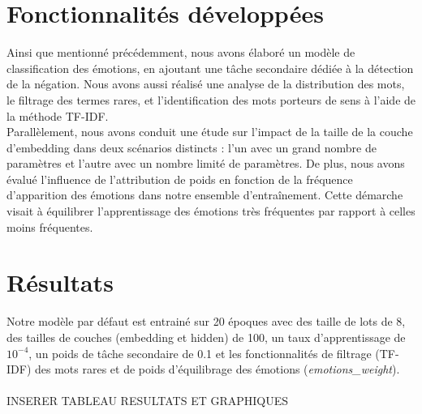 \documentclass{article}
\begin{document}
\section{Fonctionnalités développées}
Ainsi que mentionné précédemment, nous avons élaboré un modèle de classification des émotions, en ajoutant une tâche secondaire dédiée à la détection de la négation. Nous avons aussi réalisé une analyse de la distribution des mots, le filtrage des termes rares, et l'identification des mots porteurs de sens à l'aide de la méthode TF-IDF. \\
Parallèlement, nous avons conduit une étude sur l'impact de la taille de la couche d'embedding dans deux scénarios distincts : l'un avec un grand nombre de paramètres et l'autre avec un nombre limité de paramètres. De plus, nous avons évalué l'influence de l'attribution de poids en fonction de la fréquence d'apparition des émotions dans notre ensemble d'entraînement. Cette démarche visait à équilibrer l'apprentissage des émotions très fréquentes par rapport à celles moins fréquentes.

\section{Résultats}

Notre modèle par défaut est entrainé sur 20 époques avec des taille de lots de 8, des tailles de couches (embedding et hidden) de 100, un taux d'apprentissage de $10^{-4}$, un poids de tâche secondaire de 0.1 et les fonctionnalités de filtrage (TF-IDF) des mots rares et de poids d'équilibrage des émotions (\textit{emotions\_weight}).
\\\\
INSERER TABLEAU RESULTATS ET GRAPHIQUES
\end{document}
